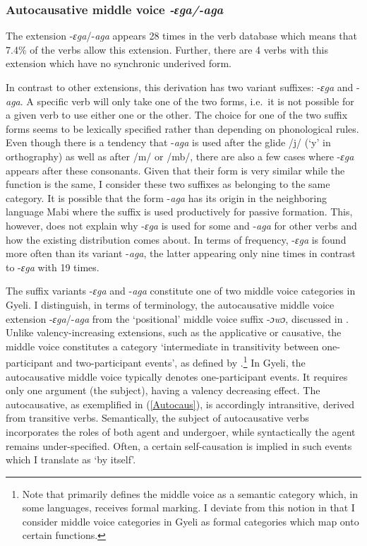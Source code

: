 \subsubsection{Autocausative middle voice \textit{-ɛga/-aga}}
\label{sec:AutoCaus}

The extension -{\itshape ɛga}/-{\itshape aga} appears 28 times in the verb database which means that 7.4\% of the verbs allow this extension. Further, there are 4 verbs with this extension which have no synchronic underived form. 

In contrast to other extensions, this derivation has two variant suffixes: -{\itshape ɛga} and -{\itshape aga}. A specific verb will only take one of the two forms, i.e.\ it is not possible for a given verb to use either one or the other. The choice for one of the two suffix forms seems to be lexically specified rather than depending on phonological rules. Even though there is a tendency that -{\itshape aga} is used after the glide /j/ (`y' in orthography) as well as after /m/ or /mb/, there are also a few cases where -{\itshape ɛga} appears after these consonants. Given that their form is very similar while the function is the same, I consider these two suffixes as belonging to the same category.  It is possible that the form -{\itshape aga} has its origin in the neighboring language Mabi where the suffix is used productively for passive formation. This, however, does not explain why -{\itshape ɛga} is used for some and -{\itshape aga} for other verbs and how the existing distribution comes about. In terms of frequency, -{\itshape ɛga} is found more often than its variant -{\itshape aga}, the latter appearing only nine times in contrast to -{\itshape ɛga} with 19 times.

The suffix variants -{\itshape ɛga} and -{\itshape aga} constitute one of two middle voice categories in Gyeli. I distinguish, in terms of terminology, the autocausative middle voice extension -{\itshape ɛga}/-{\itshape aga} from the `positional' middle voice suffix -{\itshape ɔwɔ}, discussed in . Unlike valency-increasing extensions, such as the applicative or causative, the middle voice constitutes a category `intermediate  in  transitivity  between  one-participant  and  two-participant  events', as defined by \citet[3]{kemmer93}.\footnote{Note that \citet{kemmer93} primarily defines the middle voice as a semantic category which, in some languages, receives formal marking. I deviate from this notion in that I consider middle voice categories in Gyeli as formal categories which map onto certain functions.} In Gyeli, the autocausative middle voice typically denotes one-participant events. It requires only one argument (the subject), having a valency decreasing effect. 
The autocausative, as exemplified in (\ref{Autocaus}), is accordingly intransitive, derived from transitive verbs. Semantically, the subject of autocausative verbs incorporates the roles of both agent and undergoer, while syntactically the agent remains under-specified. Often, a certain self-causation is implied in such events which I translate as `by itself'.


